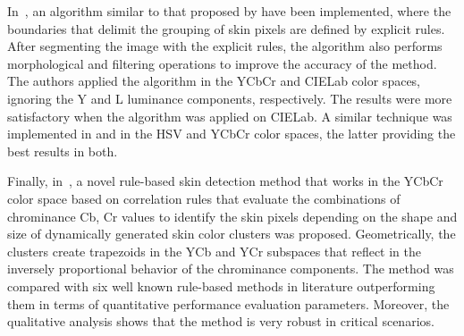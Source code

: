 In~\citet{kaur:12}, an algorithm similar to that proposed by \citet{kovac:03} have been implemented, where the boundaries that delimit the grouping of skin pixels are defined by explicit rules. After segmenting the image with the explicit rules, the algorithm also performs morphological and filtering operations to improve the accuracy of the method. The authors applied the algorithm in the YCbCr and CIELab color spaces, ignoring the Y and L luminance components, respectively. The results were more satisfactory when the algorithm was applied on CIELab. A similar technique was implemented in \citet{shaik:15} and \citet{kumar:15} in the HSV and YCbCr color spaces, the latter providing the best results in both.

Finally, in~\citet{brancati:17}, a novel rule-based skin detection method that works in the YCbCr color space based on correlation rules that evaluate the combinations of chrominance Cb, Cr values to identify the skin pixels depending on the shape and size of dynamically generated skin color clusters was proposed. Geometrically, the clusters create trapezoids in the YCb and YCr subspaces that reflect in the inversely proportional behavior of the chrominance components. The method was compared with six well known rule-based methods in literature outperforming them in terms of quantitative performance evaluation parameters. Moreover, the qualitative analysis shows that the method is very robust in critical scenarios.